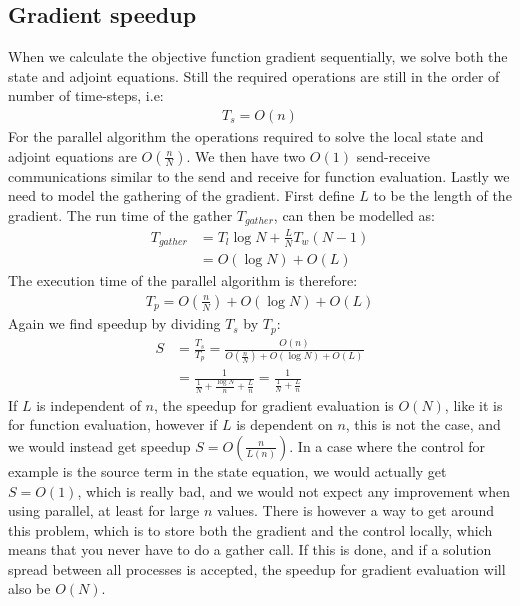 \subsection{Gradient speedup}
When we calculate the objective function gradient sequentially, we solve both the state and adjoint equations. Still the required operations are still in the order of number of time-steps, i.e:
\begin{align*}
T_s = O(n)
\end{align*}
For the parallel algorithm the operations required to solve the local state and adjoint equations are $O(\frac{n}{N})$. We then have two $O(1)$ send-receive communications similar to the send and receive for function evaluation. Lastly we need to model the gathering of the gradient. First define $L$ to be the length of the gradient. The run time of the gather $T_{gather}$, can then be modelled as:
\begin{align*}
T_{gather} &= T_l\log N + \frac{L}{N}T_w(N-1) \\
&= O(\log N) + O(L)
\end{align*}
The execution time of the parallel algorithm is therefore:
\begin{align*}
T_p = O(\frac{n}{N}) + O(\log N) + O(L)
\end{align*}
Again we find speedup by dividing $T_s$ by $T_p$:
\begin{align*}
S &= \frac{T_s}{T_p} = \frac{O(n)}{O(\frac{n}{N}) + O(\log N) + O(L)} \\
&=\frac{1}{\frac{1}{N} + \frac{\log N}{n}+\frac{L}{n}} = \frac{1}{\frac{1}{N} +\frac{L}{n}}
\end{align*}
If $L$ is independent of $n$, the speedup for gradient evaluation is $O(N)$, like it is for function evaluation, however if $L$ is dependent on $n$, this is not the case, and we would instead get speedup $S=O(\frac{n}{L(n)})$. In a case where the control for example is the source term in the state equation, we would actually get $S=O(1)$, which is really bad, and we would not expect any improvement when using parallel, at least for large $n$ values. There is however a way to get around this problem, which is to store both the gradient and the control locally, which means that you never have to do a gather call. If this is done, and if a solution spread between all processes is accepted, the speedup for gradient evaluation will also be $O(N)$.
